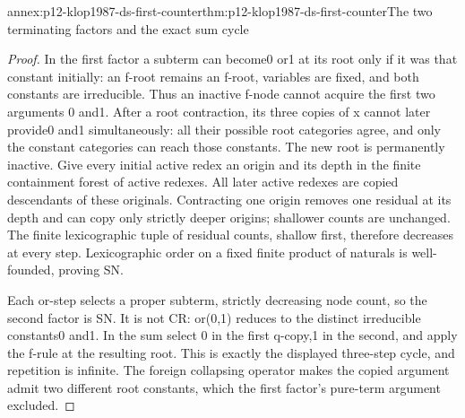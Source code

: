 \begin{annexitem}{annex:p12-klop1987-ds-first-counter}{thm:p12-klop1987-ds-first-counter}{The two terminating factors and the exact sum cycle}
\begin{proof}
In the first factor a subterm can become0 or1 at its root only
if it was that constant initially: an f-root remains an f-root,
variables are fixed, and both constants are irreducible.
Thus an inactive f-node cannot acquire the first two arguments
0 and1. After a root contraction, its three copies of x cannot
later provide0 and1 simultaneously: all their possible root
categories agree, and only the constant categories can reach those
constants. The new root is permanently inactive.
Give every initial active redex an origin and its depth in the
finite containment forest of active redexes. All later active
redexes are copied descendants of these originals. Contracting
one origin removes one residual at its depth and can copy only
strictly deeper origins; shallower counts are unchanged. The
finite lexicographic tuple of residual counts, shallow first,
therefore decreases at every step. Lexicographic order on a
fixed finite product of naturals is well-founded, proving SN.

Each or-step selects a proper subterm, strictly decreasing node
count, so the second factor is SN. It is not CR: or(0,1) reduces
to the distinct irreducible constants0 and1. In the sum select
0 in the first q-copy,1 in the second, and apply the f-rule at
the resulting root. This is exactly the displayed three-step
cycle, and repetition is infinite. The foreign collapsing
operator makes the copied argument admit two different root
constants, which the first factor's pure-term argument excluded.
\end{proof}
\end{annexitem}

